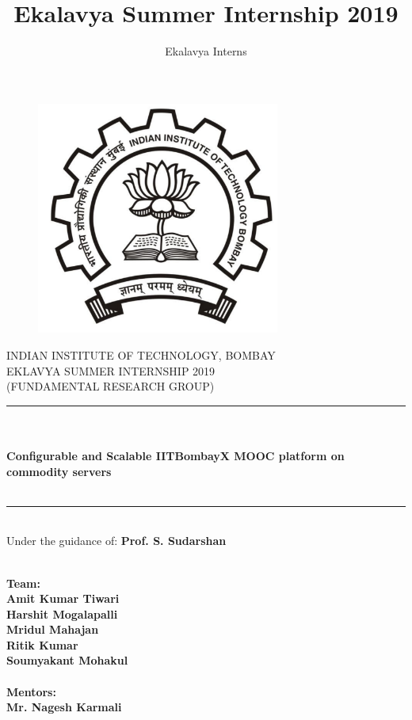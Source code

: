 \documentclass[12pt]{report}
\title{Ekalavya Summer Internship 2019}
\author{Ekalavya Interns}
\begin{document}
	\begin{titlepage}
		\begin{center}
			\begin{figure}[h]
				\centering
				\includegraphics[width=8cm]{./iitb-black.pdf}
			\end{figure}
			
			INDIAN INSTITUTE OF TECHNOLOGY, BOMBAY\\
			EKLAVYA SUMMER INTERNSHIP 2019\\
			(FUNDAMENTAL RESEARCH GROUP) 
			\noindent\rule{15cm}{0.4pt}\\
			\textbf{\huge \\Configurable and Scalable IITBombayX MOOC platform on commodity servers}\\
			\textbf{}\\
			\noindent\rule{15cm}{0.4pt}
			\newline
			\\Under the guidance of: \textbf{Prof. S. Sudarshan}
			\begin{multicols}{2}
				\textbf{\\ \large
					\textbf{Team:} \\
					\textbf{Amit Kumar Tiwari}\\
					\textbf{Harshit Mogalapalli}\\
					\textbf{Mridul Mahajan}\\
					\textbf{Ritik Kumar}\\
					\textbf{Soumyakant Mohakul}\\
				}
				\columnbreak
				\textbf{\\ \large
					\textbf{Mentors:}\\
					\textbf{Mr. Nagesh Karmali}
				}
			\end{multicols}
			
		\end{center}
	\end{titlepage}
	
\end{document}

